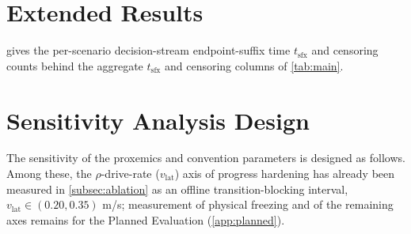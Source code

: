 \section{Extended Results}\label{app:extended}

 gives the per-scenario decision-stream endpoint-suffix time $t_{\text{sfx}}$ and censoring counts behind the aggregate $t_{\text{sfx}}$ and censoring columns of \cref{tab:main}.



\section{Sensitivity Analysis Design}\label{app:sensitivity}

The sensitivity of the proxemics and convention parameters is designed as follows. Among these, the $\rho$-drive-rate ($v_{\text{lat}}$) axis of progress hardening has already been measured in \cref{subsec:ablation} as an offline transition-blocking interval, $v_{\text{lat}} \in (0.20, 0.35)$ m/s; measurement of physical freezing and of the remaining axes remains for the Planned Evaluation (\cref{app:planned}).

